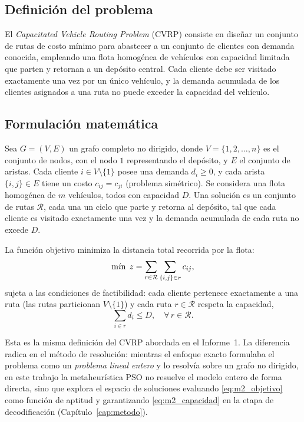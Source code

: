 \subsection{Definición del problema}

El \textit{Capacitated Vehicle Routing Problem} (CVRP) consiste en diseñar un conjunto de
rutas de costo mínimo para abastecer a un conjunto de clientes con demanda conocida,
empleando una flota homogénea de vehículos con capacidad limitada que parten y retornan a
un depósito central. Cada cliente debe ser visitado exactamente una vez por un único
vehículo, y la demanda acumulada de los clientes asignados a una ruta no puede exceder la
capacidad del vehículo.

\subsection{Formulación matemática}

Sea $G=(V,E)$ un grafo completo no dirigido, donde $V=\{1,2,\dots,n\}$ es el conjunto de
nodos, con el nodo $1$ representando el depósito, y $E$ el conjunto de aristas. Cada
cliente $i\in V\setminus\{1\}$ posee una demanda $d_i \ge 0$, y cada arista
$\{i,j\}\in E$ tiene un costo $c_{ij}=c_{ji}$ (problema simétrico). Se considera una flota
homogénea de $m$ vehículos, todos con capacidad $D$. Una solución es un conjunto de rutas
$\mathcal{R}$, cada una un ciclo que parte y retorna al depósito, tal que cada cliente es
visitado exactamente una vez y la demanda acumulada de cada ruta no excede $D$.

La función objetivo minimiza la distancia total recorrida por la flota:
\begin{equation}
    \operatorname*{m\acute{\imath}n} \; z = \sum_{r \in \mathcal{R}} \sum_{\{i,j\} \in r} c_{ij},
    \label{eq:m2_objetivo}
\end{equation}
sujeta a las condiciones de factibilidad: cada cliente pertenece exactamente a una ruta
(las rutas particionan $V\setminus\{1\}$) y cada ruta $r\in\mathcal{R}$ respeta la
capacidad,
\begin{equation}
    \sum_{i \in r} d_i \le D, \quad \forall\, r \in \mathcal{R}.
    \label{eq:m2_capacidad}
\end{equation}

Esta es la misma definición del CVRP abordada en el Informe~1. La diferencia radica en el
método de resolución: mientras el enfoque exacto formulaba el problema como un
\textit{problema lineal entero} y lo resolvía sobre un grafo no dirigido, en este trabajo
la metaheurística PSO no resuelve el modelo entero de forma directa, sino que explora el
espacio de soluciones evaluando \eqref{eq:m2_objetivo} como función de aptitud y
garantizando \eqref{eq:m2_capacidad} en la etapa de decodificación (Capítulo~\ref{cap:metodo}).
